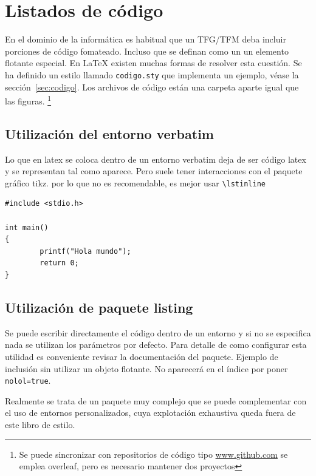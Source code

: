  \section{Listados de código}

En el dominio de la informática es habitual que un TFG/TFM deba incluir porciones de código fomateado. Incluso que se definan como un un elemento flotante especial. En \LaTeX{} existen muchas formas de resolver esta cuestión. Se ha definido un estilo llamado \lstinline[language=enparrafo]!codigo.sty! que implementa un ejemplo, véase la sección~\ref{sec:codigo}. Los archivos de código están una carpeta aparte igual que las figuras. \footnote{Se puede sincronizar con repositorios de código tipo \url{www.github.com} se emplea overleaf, pero es necesario mantener dos proyectos}

\subsection{Utilización del entorno verbatim}
Lo que en latex se coloca dentro de un entorno verbatim deja de ser código latex y se representan tal como aparece. Pero suele tener interacciones con el paquete  gráfico tikz. por lo que no es recomendable, es mejor usar \lstinline[language=enparrafo]!\lstinline!

\begin{verbatim}
#include <stdio.h>

int main()
{
        printf("Hola mundo");
        return 0;
}
\end{verbatim}

\subsection{Utilización de paquete listing}


Se puede escribir directamente el código dentro de un entorno y si no se especifica nada se utilizan los parámetros por defecto. Para detalle de como configurar esta utilidad es conveniente revisar la documentación del paquete. Ejemplo de inclusión sin utilizar un objeto flotante. No aparecerá en el índice por poner \lstinline[language=enparrafo]!nolol=true!.



Realmente se trata de un paquete muy complejo que se puede complementar con el uso de entornos personalizados, cuya explotación exhaustiva queda fuera de este libro de estilo.


